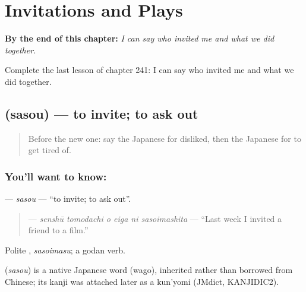 
\chapter{Invitations and Plays}
\label{ch:ja-invitations-and-plays}

\begin{chapteropening}
\textbf{By the end of this chapter:} \emph{I can say who invited me and what we did together.}

Complete the last lesson of chapter 241: I can say who invited me and what we did together.
\end{chapteropening}

\section[\texorpdfstring{\ja{さそう} (sasou)}{さそう (sasou)}]{ (sasou) — to invite; to ask out}

\label{lesson:JA-C241-sasou}



\begin{quote}
Before the new one: say the Japanese for disliked, then the Japanese for to get tired of.
\end{quote}

\subsection*{You'll want to know: }
\textbf{} — \emph{sasou} — \textquotedblleft{}to invite; to ask out\textquotedblright{}.

\begin{quote}
\textbf{   } — \emph{senshū tomodachi o eiga ni sasoimashita} — \textquotedblleft{}Last week I invited a friend to a film.\textquotedblright{}
\end{quote}

Polite \textbf{}, \emph{sasoimasu}; a godan verb.

\begin{cousinweb}
\textbf{} (\emph{sasou}) is a native Japanese word (wago), inherited rather than borrowed from Chinese; its kanji was attached later as a kun'yomi (JMdict, KANJIDIC2).
\end{cousinweb}

